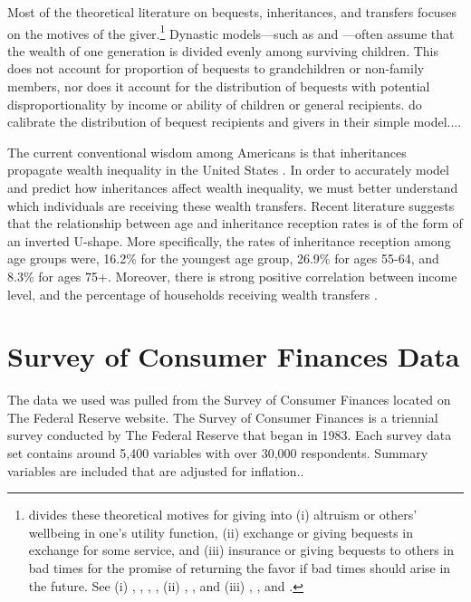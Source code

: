 \documentclass[letterpaper,12pt]{article}
\theoremstyle{definition}
\begin{document}
\begin{spacing}{1.5}
  Most of the theoretical literature on bequests, inheritances, and transfers focuses on the motives of the giver.\footnote{\citet{Wolff:2015} divides these theoretical motives for giving into (i) altruism or others' wellbeing in one's utility function, (ii) exchange or giving bequests in exchange for some service, and (iii) insurance or giving bequests to others in bad times for the promise of returning the favor if bad times should arise in the future. See (i) \citet{Barro:1974}, \citet{Becker:1974}, \citet{BeckerTomes:1979}, \citet{Tomes:1981}, (ii) \citet{BernheimEtAl:1985}, \citet{Cox:1987}, and (iii) \citet{Cox:1990}, \citet{CoxJappelli:1990}, and \citet{Kochar:1997}.} Dynastic models---such as \citet{GokhaleEtAl:2001} and \citet{FarhiWerning:2010}---often assume that the wealth of one generation is divided evenly among surviving children. This does not account for proportion of bequests to grandchildren or non-family members, nor does it account for the distribution of bequests with potential disproportionality by income or ability of children or general recipients. \citet{PikettySaez:2013} do calibrate the distribution of bequest recipients and givers in their simple model....

  The current conventional wisdom among Americans is that inheritances propagate wealth inequality in the United States \citet{Wolff:2015}. In order to accurately model and predict how inheritances affect wealth inequality, we must better understand which individuals are receiving these wealth transfers. Recent literature suggests that the relationship between age and inheritance reception rates is of the form of an inverted U-shape. More specifically, the rates of inheritance reception among age groups were, 16.2\% for the youngest age group, 26.9\% for ages 55-64, and 8.3\% for ages 75+. Moreover, there is strong positive correlation between income level, and the percentage of households receiving wealth transfers \citet{Wolff:2015}.


\section{Survey of Consumer Finances Data}\label{SecSCFdata}

  The data we used was pulled from the Survey of Consumer Finances located on The Federal Reserve website. The Survey of Consumer Finances is a triennial survey conducted by The Federal Reserve that began in 1983. Each survey data set contains around 5,400 variables with over 30,000 respondents. Summary variables are included that are adjusted for inflation.\citet{FED}.


\end{spacing}
\end{document}
